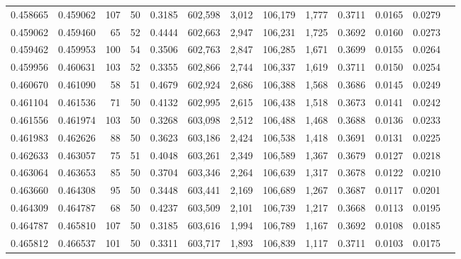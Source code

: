 \begin{tabular}{rrrrrrrrrrrrr}
0.458665 & 0.459062 &   107 &  50 &                                     0.3185 & 602,598 &   3,012 & 106,179 &   1,777 & 0.3711 & 0.0165 & 0.0279 \\
0.459062 & 0.459460 &    65 &  52 &                                     0.4444 & 602,663 &   2,947 & 106,231 &   1,725 & 0.3692 & 0.0160 & 0.0273 \\
0.459462 & 0.459953 &   100 &  54 &                                     0.3506 & 602,763 &   2,847 & 106,285 &   1,671 & 0.3699 & 0.0155 & 0.0264 \\
0.459956 & 0.460631 &   103 &  52 &                                     0.3355 & 602,866 &   2,744 & 106,337 &   1,619 & 0.3711 & 0.0150 & 0.0254 \\
0.460670 & 0.461090 &    58 &  51 &                                     0.4679 & 602,924 &   2,686 & 106,388 &   1,568 & 0.3686 & 0.0145 & 0.0249 \\
0.461104 & 0.461536 &    71 &  50 &                                     0.4132 & 602,995 &   2,615 & 106,438 &   1,518 & 0.3673 & 0.0141 & 0.0242 \\
0.461556 & 0.461974 &   103 &  50 &                                     0.3268 & 603,098 &   2,512 & 106,488 &   1,468 & 0.3688 & 0.0136 & 0.0233 \\
0.461983 & 0.462626 &    88 &  50 &                                     0.3623 & 603,186 &   2,424 & 106,538 &   1,418 & 0.3691 & 0.0131 & 0.0225 \\
0.462633 & 0.463057 &    75 &  51 &                                     0.4048 & 603,261 &   2,349 & 106,589 &   1,367 & 0.3679 & 0.0127 & 0.0218 \\
0.463064 & 0.463653 &    85 &  50 &                                     0.3704 & 603,346 &   2,264 & 106,639 &   1,317 & 0.3678 & 0.0122 & 0.0210 \\
0.463660 & 0.464308 &    95 &  50 &                                     0.3448 & 603,441 &   2,169 & 106,689 &   1,267 & 0.3687 & 0.0117 & 0.0201 \\
0.464309 & 0.464787 &    68 &  50 &                                     0.4237 & 603,509 &   2,101 & 106,739 &   1,217 & 0.3668 & 0.0113 & 0.0195 \\
0.464787 & 0.465810 &   107 &  50 &                                     0.3185 & 603,616 &   1,994 & 106,789 &   1,167 & 0.3692 & 0.0108 & 0.0185 \\
0.465812 & 0.466537 &   101 &  50 &                                     0.3311 & 603,717 &   1,893 & 106,839 &   1,117 & 0.3711 & 0.0103 & 0.0175 \\

\end{tabular}
